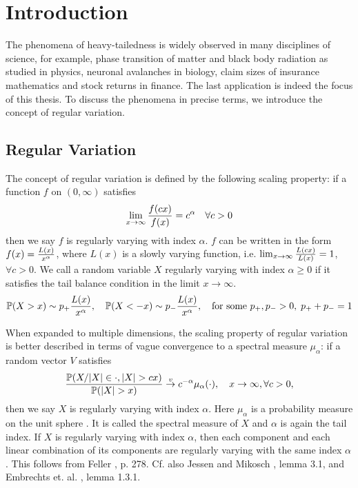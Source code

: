 \chapter{Introduction}\label{ch:intr}
The phenomena of heavy-tailedness is widely observed in many
disciplines of science, for example, phase transition of matter and
black body radiation as studied in physics, neuronal avalanches in
biology, claim sizes of insurance mathematics and stock returns in
finance. The last application is indeed the focus of this thesis. To
discuss the phenomena in precise terms, we introduce the concept of
regular variation.

\section{Regular Variation}\label{sec:intro_regvar}
The concept of regular variation is defined by the following scaling
property: if a function $f$ on $(0, \infty)$ satisfies
\[
\lim_{x \to \infty} {f(c x) \over f(x)} = c^\alpha
\quad
\forall c > 0
\]
then we say $f$ is regularly varying with index $\alpha$.
$f$ can be written in the form $f(x) = {L(x) \over x^\alpha}$, where
$L(x)$ is a slowly varying function, i.e.
$\lim_{x \to \infty} {L(c x) \over L(x)} = 1$, $\forall c > 0$.
We call a random variable $X$ regularly varying with index
$\alpha \geq 0$ if it satisfies the tail balance condition in the
limit $x \to \infty$.
\[
\P(X > x) \sim p_+ {L(x) \over x^\alpha},\quad
\P(X < -x) \sim p_- {L(x) \over x^\alpha}, \quad
\text{for some } p_+, p_- > 0,\; p_+ + p_- = 1
\]

When expanded to multiple dimensions, the scaling property of regular
variation is better described in terms of vague convergence to a
spectral measure $\mu_\alpha$: if a random vector $V$ satisfies
\[
{
  \P(X/|X| \in \cdot, |X| > c x)
  \over
  \P(|X| > x)
}
\overset{v}{\to} c^{-\alpha} \mu_\alpha(\cdot),
\quad
x \to \infty, \forall c > 0,
\]
then we say $X$ is regularly varying with index $\alpha$. Here
$\mu_\alpha$ is a probability measure on the unit sphere
\cite{buraczewski:damek:mikosch:2016}. It is called the spectral 
measure of $X$ and $\alpha$ is again the tail index.
If $X$ is regularly varying with index $\alpha$, then each component
and each linear combination of its components are regularly
varying with the same index $\alpha$. This follows from Feller
\cite{feller}, p. 278. Cf. also Jessen and Mikosch
\cite{JessenMikosch2006}, lemma 3.1, and Embrechts et. al.
\cite{embrechts:klueppelberg:mikosch:1997}, lemma 1.3.1.

